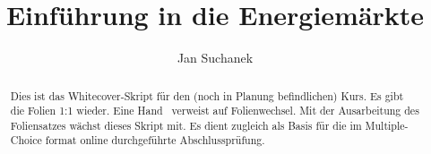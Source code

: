 \documentclass[paper=a5,listof=totoc]{scrartcl}
\title{Einführung in die Energiemärkte}
\author{Jan Suchanek}
\begin{document}
\onehalfspacing

\maketitle

\begin{abstract}
    Dies ist das Whitecover-Skript für den (noch in Planung befindlichen) Kurs. Es gibt die Folien 1:1 wieder. Eine Hand \faHandPointRight\ verweist auf Folienwechsel. Mit der Ausarbeitung des Foliensatzes wächst dieses Skript mit. Es dient zugleich als Basis für die im Multiple-Choice format online durchgeführte Abschlussprüfung.
\end{abstract}

\newpage

\tableofcontents

\clearpage












\clearpage

\listoffigures
 
\listoftables

\newpage

   \nocite{*}
    \printbibliography[heading=bibintoc]

    \clearpage
    \thispagestyle{empty}
    
    ~
    

\cleardoublepage
{}
{}
\printindex
\end{document}
